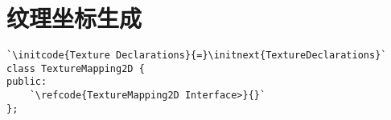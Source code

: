 \section{纹理坐标生成}\label{sec:纹理坐标生成}

\begin{lstlisting}
`\initcode{Texture Declarations}{=}\initnext{TextureDeclarations}`
class TextureMapping2D {
public:
    `\refcode{TextureMapping2D Interface>}{}`
};
\end{lstlisting}
